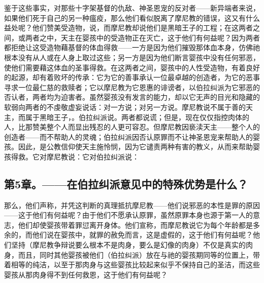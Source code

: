 鉴于这些事实，对那些十字架基督的仇敌、神圣恩宠的反对者——新异端者来说，如果他们死于自己的另一种瘟疫，那么他们看似脱离了摩尼教的错误，这又有什么益处呢？他们赞美受造物，说，而摩尼教却说他们是黑暗王子的工程；在这两者之间，或两者之中，天主在婴孩中的受造物正在灭亡，这于他们有何益呢？因为两者都拒绝让这受造物藉基督的体血得救——一方是因为他们摧毁那体血本身，仿佛祂根本没有从人或在人身上取过这些；另一方是因为他们断言婴孩中没有任何邪恶，使他们需要藉这体血的圣事得救。在这两者之间，婴孩中的人性受造物，有着良好的起源，却有着败坏的传承：它为它的善事承认一位最卓越的创造者，为它的恶事寻求一位最仁慈的救赎者；它以摩尼教为它恩惠的诽谤者，以伯拉纠派为它邪恶的否认者，两者均为迫害者。虽然婴孩没有发言的能力，却以它无声的目光和隐藏的软弱向两者的不虔敬虚妄说话：对一方说；对另一方说。摩尼教说不属于善的天主，而属于黑暗王子，。伯拉纠派说。两者都说谎；但是，现在仅仅指控肉体的人，比那赞美整个人而显出残忍的人更可容忍。但摩尼教因亵渎天主——整个人的创造者——而不帮助人的灵魂；伯拉纠派因否认原罪而不让神圣恩宠来帮助人的婴孩。因此，是公教信仰使天主施怜悯，因为它谴责两种有害的教义，从而来帮助婴孩得救。它对摩尼教说：它对伯拉纠派说：\par


\subsection{第5章。——在伯拉纠派意见中的特殊优势是什么？}

那么，他们声称，并凭这判断的真理抵抗摩尼教——他们说邪恶的本性是罪的原因——这于他们有何益呢？由于他们不愿承认原罪，虽然原罪本身也源于第一人的意志，他们却使婴孩带着罪愆离开身体。他们宣称，而摩尼教说它为每个年龄都是多余的，而他们说在婴孩中，就罪的赦免而言，这是虚假的，这于他们有何益呢？他们坚持（摩尼教争辩说要么根本不是肉身，要么是幻像的肉身）不仅是真实的肉身，而且，同时其他婴孩被他们（伯拉纠派）放在与祂的婴孩期同等的位置上，带着相等的纯洁，以至于那肉身与这些婴孩比较起来似乎不保持自己的圣洁，而这些婴孩从那肉身得不到任何救恩，这于他们有何益呢？\par


